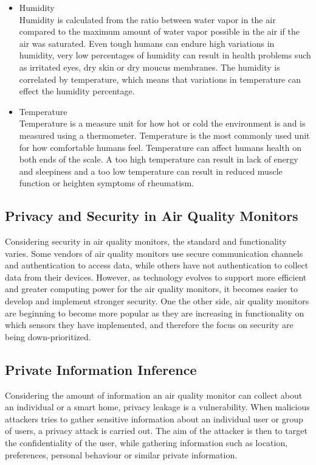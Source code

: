 \begin{itemize}
    \item Humidity\\
        Humidity is calculated from the ratio between water vapor in the air compared to the maximum amount of water vapor possible in the air if the air was saturated. \cite{RecommendedIAQ} Even tough humans can endure high variations in humidity, very low percentages of humidity can result in health problems such as irritated eyes, dry skin or dry moucus membranes. The humidity is correlated by temperature, which means that variations in temperature can effect the humidity percentage.
    \item Temperature\\
        Temperature is a measure unit for how hot or cold the environment is and is measured using a thermometer. Temperature is the most commonly used unit for how comfortable humans feel. Temperature can affect humans health on both ends of the scale. A too high temperature can result in lack of energy and sleepiness and a too low temperature can result in reduced muscle function or heighten symptoms of rheumatism. \cite{Temp}
\end{itemize}

\subsection*{Privacy and Security in Air Quality Monitors}
Considering security in air quality monitors, the standard and functionality varies. \cite{AQMHowFarFunctionality} Some vendors of air quality monitors use secure communication channels and authentication to access data, while others have not authentication to collect data from their devices. However, as technology evolves to support more efficient and greater computing power for the air quality monitors, it becomes easier to develop and implement stronger security. One the other side, air quality monitors are beginning to become more popular as they are increasing in functionality on which sensors they have implemented, and therefore the focus on security are being down-prioritized. \cite{SecurityAndDataIntInAQM} 

\subsection*{Private Information Inference}
Considering the amount of information an air quality monitor can collect about an individual or a smart home, privacy leakage is a vulnerability. \cite{SecPrivSmartCity} When malicious attackers tries to gather sensitive information about an individual user or group of users, a privacy attack is carried out. \cite{CyberEntitySecInIoT} The aim of the attacker is then to target the confidentiality of the user, while gathering information such as location, preferences, personal behaviour or similar private information.

